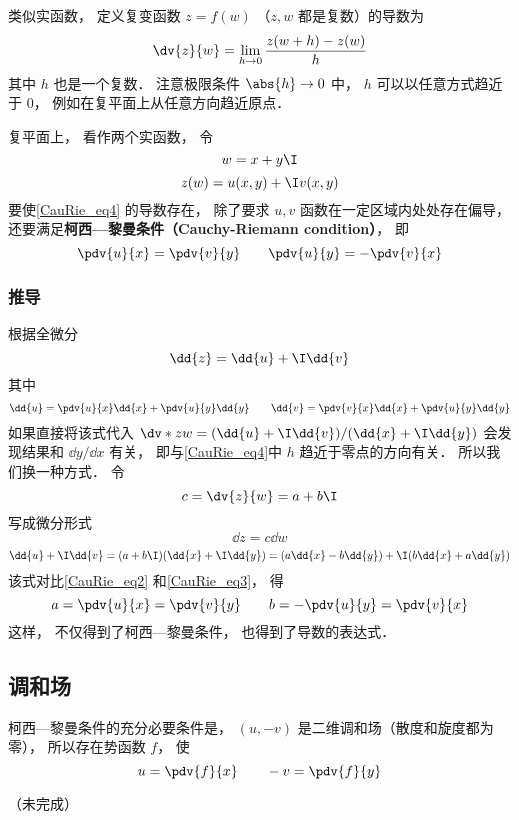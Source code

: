 

类似实函数， 定义复变函数 $z = f(w)$ （$z, w$ 都是复数）的导数为
\begin{equation}\label{CauRie_eq4}
\dv{z}{w} = \lim_{h\to 0} \frac{z(w + h) - z(w)}{h}
\end{equation}
其中 $h$ 也是一个复数． 注意极限条件 $\abs{h}\to 0$ 中， $h$ 可以以任意方式趋近于 $0$， 例如在复平面上从任意方向趋近原点．

复平面上， 看作两个实函数， 令
\begin{equation}
w = x + y\I
\end{equation}
\begin{equation}
z(w) = u(x, y) + \I v(x, y)
\end{equation}
要使\autoref{CauRie_eq4} 的导数存在， 除了要求 $u, v$ 函数在一定区域内处处存在偏导， 还要满足\textbf{柯西—黎曼条件（Cauchy-Riemann condition）}， 即
\begin{equation}\label{CauRie_eq1}
\pdv{u}{x} = \pdv{v}{y} \qquad
\pdv{u}{y} = - \pdv{v}{x}
\end{equation}

\subsubsection{推导}
根据全微分
\begin{equation}\label{CauRie_eq2}
\dd{z} = \dd{u} + \I \dd{v}
\end{equation}
其中
\begin{equation}\label{CauRie_eq3}
\dd{u} = \pdv{u}{x} \dd{x} + \pdv{u}{y} \dd{y} \qquad
\dd{v} = \pdv{v}{x} \dd{x} + \pdv{u}{y} \dd{y}
\end{equation}
如果直接将该式代入 $\dv*{z}{w} = (\dd{u} + \I \dd{v})/(\dd{x} + \I \dd{y})$ 会发现结果和 $\dd{y}/\dd{x}$ 有关， 即与\autoref{CauRie_eq4}中 $h$ 趋近于零点的方向有关． 所以我们换一种方式． 令
\begin{equation}
c = \dv{z}{w} = a + b\I
\end{equation}
写成微分形式
\begin{equation}
\dd{z} = c\dd{w}
\end{equation}
\begin{equation}
\dd{u} + \I \dd{v} = (a + b\I)(\dd{x} + \I\dd{y}) = (a \dd{x} - b\dd{y}) + \I (b \dd{x} + a\dd{y})
\end{equation}
该式对比\autoref{CauRie_eq2} 和\autoref{CauRie_eq3}， 得
\begin{equation}
a = \pdv{u}{x} = \pdv{v}{y} \qquad
b = -\pdv{u}{y} = \pdv{v}{x}
\end{equation}
这样， 不仅得到了柯西—黎曼条件， 也得到了导数的表达式．


\subsection{调和场}

柯西—黎曼条件的充分必要条件是， $(u, -v)$ 是二维调和场（散度和旋度都为零）， 所以存在势函数 $f$， 使
\begin{equation}
u = \pdv{f}{x} \qquad -v = \pdv{f}{y}
\end{equation}

（未完成）
